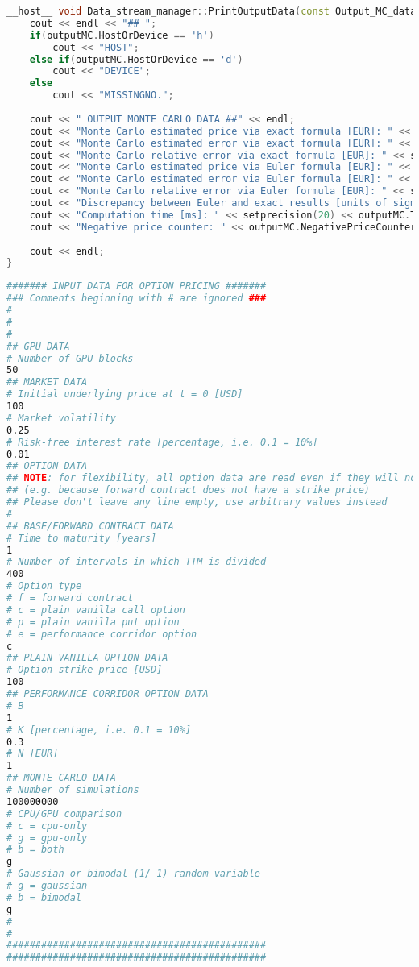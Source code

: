 \begin{lstlisting}[language=C++, caption={\texttt{libraries/CoreLibraries/DataStreamManager/Data\_stream\_manager.cu}}]
__host__ void Data_stream_manager::PrintOutputData(const Output_MC_data& outputMC) const{
	cout << endl << "## ";
	if(outputMC.HostOrDevice == 'h')
		cout << "HOST";
	else if(outputMC.HostOrDevice == 'd')
		cout << "DEVICE";
	else
		cout << "MISSINGNO.";
	
	cout << " OUTPUT MONTE CARLO DATA ##" << endl;
	cout << "Monte Carlo estimated price via exact formula [EUR]: " << setprecision(20) << outputMC.EstimatedPriceMCExact << endl;
	cout << "Monte Carlo estimated error via exact formula [EUR]: " << setprecision(20) << outputMC.ErrorMCExact << endl;
	cout << "Monte Carlo relative error via exact formula [EUR]: " << setprecision(20) << outputMC.GetRelativeErrorExact() << endl;
	cout << "Monte Carlo estimated price via Euler formula [EUR]: " << setprecision(20) << outputMC.EstimatedPriceMCEuler << endl;
	cout << "Monte Carlo estimated error via Euler formula [EUR]: " << setprecision(20) << outputMC.ErrorMCEuler << endl;
	cout << "Monte Carlo relative error via Euler formula [EUR]: " << setprecision(20) << outputMC.GetRelativeErrorEuler() << endl;
	cout << "Discrepancy between Euler and exact results [units of sigma]: " << setprecision(20) << outputMC.GetEulerToExactDiscrepancy() << endl;
	cout << "Computation time [ms]: " << setprecision(20) << outputMC.Tick << endl;
	cout << "Negative price counter: " << outputMC.NegativePriceCounter << endl;
	
	cout << endl;	
}
\end{lstlisting}

\begin{lstlisting}[language=bash, caption={\texttt{input.dat}}]
####### INPUT DATA FOR OPTION PRICING #######
### Comments beginning with # are ignored ###
#
#
#
## GPU DATA
# Number of GPU blocks
50
## MARKET DATA
# Initial underlying price at t = 0 [USD]
100
# Market volatility
0.25
# Risk-free interest rate [percentage, i.e. 0.1 = 10%]
0.01
## OPTION DATA
## NOTE: for flexibility, all option data are read even if they will not be used
## (e.g. because forward contract does not have a strike price)
## Please don't leave any line empty, use arbitrary values instead
#
## BASE/FORWARD CONTRACT DATA
# Time to maturity [years]
1
# Number of intervals in which TTM is divided
400
# Option type
# f = forward contract
# c = plain vanilla call option
# p = plain vanilla put option
# e = performance corridor option
c
## PLAIN VANILLA OPTION DATA
# Option strike price [USD]
100
## PERFORMANCE CORRIDOR OPTION DATA
# B
1
# K [percentage, i.e. 0.1 = 10%]
0.3
# N [EUR]
1
## MONTE CARLO DATA
# Number of simulations
100000000
# CPU/GPU comparison
# c = cpu-only
# g = gpu-only
# b = both
g
# Gaussian or bimodal (1/-1) random variable
# g = gaussian
# b = bimodal
g
#
#
#############################################
#############################################
\end{lstlisting}

